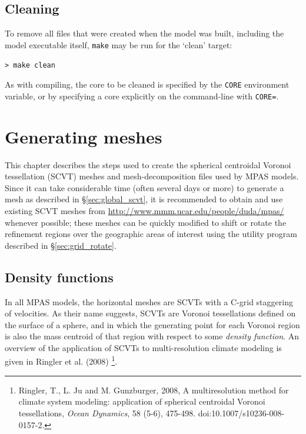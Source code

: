 \documentclass[11pt]{report}
\begin{document}
\section{Cleaning}

To remove all files  that were created when the model was built, including the model executable itself, {\tt make} may
be run for the `clean' target:

\vspace{12pt}
{\tt > make clean}
\vspace{12pt}

As with compiling, the core to be cleaned is specified by the {\tt CORE} environment variable, or by specifying a core explicitly on the command-line with {\tt CORE=}.



\chapter{Generating meshes}

This chapter describes the steps used to create the  spherical centroidal Voronoi tessellation (SCVT) meshes and mesh-decomposition files used by MPAS models.
Since it can take considerable time (often several days or more) to generate a mesh as described in \S \ref{sec:global_scvt}, it is recommended to obtain 
and use existing SCVT meshes from \url{http://www.mmm.ucar.edu/people/duda/mpas/} whenever possible; these meshes can be quickly
modified to shift or rotate the refinement regions over the geographic areas of interest using the utility program described in \S \ref{sec:grid_rotate}.

\section{Density functions}

In all MPAS models, the horizontal meshes are SCVTs with a C-grid staggering of
velocities. As their name suggests, SCVTs are Voronoi tessellations defined on the surface of a sphere, and in which the generating 
point for each Voronoi region is also the mass centroid of that region with respect to some {\em density function}. An overview of
the application of SCVTs to multi-resolution climate modeling is given in Ringler et al. (2008)
\footnote{Ringler, T., L. Ju and M. Gunzburger, 2008, A multiresolution method for climate system modeling: application of spherical centroidal Voronoi tessellations, {\em Ocean Dynamics}, 58 (5-6), 475-498. doi:10.1007/s10236-008-0157-2.}.
\end{document}
